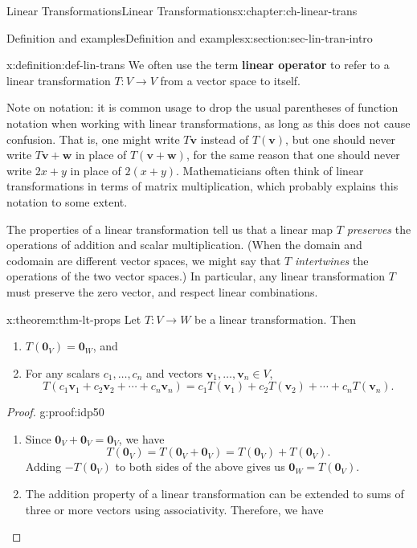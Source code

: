 \documentclass[oneside,10pt,]{book}
\newcommand{\terminology}[1]{\textbf{#1}}
\numberwithin{equation}{section}
\newcommand{\vv}{\mathbf{v}}
\newcommand{\ww}{\mathbf{w}}
\begin{document}
\begin{chapterptx}{Linear Transformations}{}{Linear Transformations}{}{}{x:chapter:ch-linear-trans}
\begin{sectionptx}{Definition and examples}{}{Definition and examples}{}{}{x:section:sec-lin-tran-intro}
\begin{definition}{}{x:definition:def-lin-trans}
We often use the term \terminology{linear operator} to refer to a linear transformation \(T:V\to V\) from a vector space to itself.%
\end{definition}
Note on notation: it is common usage to drop the usual parentheses of function notation when working with linear transformations, as long as this does not cause confusion. That is, one might write \(T\vv\) instead of \(T(\vv)\), but one should never write \(T\vv+\ww\) in place of \(T(\vv+\ww)\), for the same reason that one should never write \(2x+y\) in place of \(2(x+y)\). Mathematicians often think of linear transformations in terms of matrix multiplication, which probably explains this notation to some extent.%
\par
The properties of a linear transformation tell us that a linear map \(T\) \emph{preserves} the operations of addition and scalar multiplication. (When the domain and codomain are different vector spaces, we might say that \(T\) \emph{intertwines} the operations of the two vector spaces.) In particular, any linear transformation \(T\) must preserve the zero vector, and respect linear combinations.%
\begin{theorem}{}{}{x:theorem:thm-lt-props}%
Let \(T:V\to W\) be a linear transformation. Then%
\begin{enumerate}
\item{}\(T(\mathbf{0}_V) = \mathbf{0}_W\), and%
\item{}For any scalars \(c_1,\ldots, c_n\) and vectors \(\vv_1,\ldots, \vv_n\in V\),%
\begin{equation*}
T(c_1\vv_1+c_2\vv_2+\cdots + c_n\vv_n) = c_1T(\vv_1)+c_2T(\vv_2)+\cdots + c_nT(\vv_n)\text{.}
\end{equation*}
%
\end{enumerate}
%
\end{theorem}
\begin{proof}{}{g:proof:idp50}
%
\begin{enumerate}
\item{}Since \(\mathbf{0}_V+\mathbf{0}_V = \mathbf{0}_V\), we have%
\begin{equation*}
T(\mathbf{0}_V) = T(\mathbf{0}_V+\mathbf{0}_V) = T(\mathbf{0}_V)+T(\mathbf{0}_V)\text{.}
\end{equation*}
Adding \(-T(\mathbf{0}_V)\) to both sides of the above gives us \(\mathbf{0}_W = T(\mathbf{0}_V)\).%
\item{}The addition property of a linear transformation can be extended to sums of three or more vectors using associativity. Therefore, we have%

\end{enumerate}
\end{proof}
\end{sectionptx}
\end{chapterptx}
\end{document}
